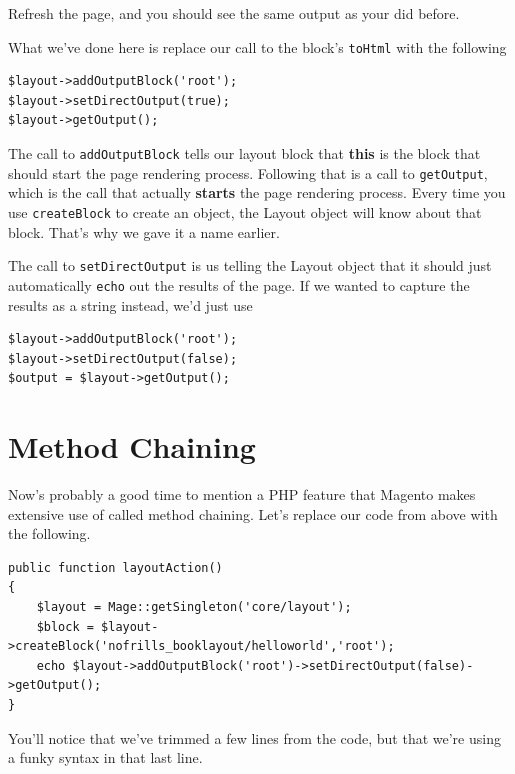 \documentclass[oneside]{book}
\begin{document}
Refresh the page, and you should see the same output as your did before.

What we've done here is replace our call to the block's \footnotesize\texttt{toHtml} \normalsize  with the following

\begin{lstlisting}
$layout->addOutputBlock('root');
$layout->setDirectOutput(true);
$layout->getOutput();

\end{lstlisting}


The call to \footnotesize\texttt{addOutputBlock} \normalsize  tells our layout block that \textbf{this} is the block that should start the page rendering process.  Following that is a call to \footnotesize\texttt{getOutput}\normalsize,  which is the call that actually \textbf{starts} the page rendering process.  Every time you use \footnotesize\texttt{createBlock} \normalsize  to create an object, the Layout object will know about that block.  That's why we gave it a name earlier.

The call to \footnotesize\texttt{setDirectOutput} \normalsize  is us telling the Layout object that it should just automatically \footnotesize\texttt{echo} \normalsize  out the results of the page.   If we wanted to capture the results as a string instead, we'd just use

\begin{lstlisting}
$layout->addOutputBlock('root');
$layout->setDirectOutput(false);
$output = $layout->getOutput();

\end{lstlisting}


\section{Method Chaining}

Now's probably a good time to mention a PHP feature that Magento makes extensive use of called method chaining.  Let's replace our code from above with the following.

\begin{lstlisting}
public function layoutAction()
{
    $layout = Mage::getSingleton('core/layout');
    $block = $layout->createBlock('nofrills_booklayout/helloworld','root');
    echo $layout->addOutputBlock('root')->setDirectOutput(false)->getOutput();
}

\end{lstlisting}


You'll notice that we've trimmed a few lines from the code, but that we're using a funky syntax in that last line.
\end{document}
